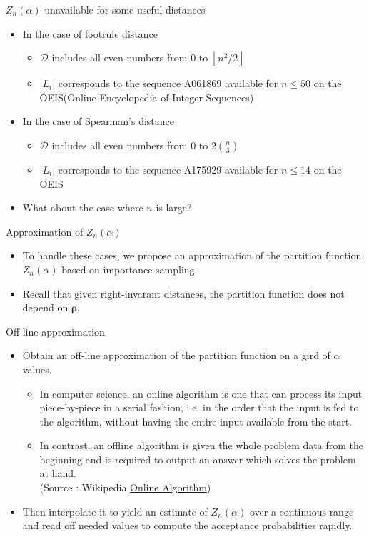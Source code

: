 \documentclass[11pt]{beamer}
\newcommand{\floor}[1]{\left\lfloor #1 \right\rfloor}
\begin{document}
\begin{frame}{$Z_n(\alpha)$ unavailable for some useful distances}
\begin{itemize}
    \item In the case of footrule distance
    \begin{itemize}
        \item $\mathcal{D}$ includes all even numbers from $0$ to $\floor{n^2/2}$
        \item $|L_i|$ corresponds to the sequence A061869 available for $n\leq 50$ on the OEIS(Online Encyclopedia of Integer Sequences)
    \end{itemize}
    \item In the case of Spearman's distance
    \begin{itemize}
        \item $\mathcal{D}$ includes all even numbers from $0$ to $2\binom{n}{3}$
        \item $|L_i|$ corresponds to the sequence A175929 available for $n\leq 14$ on the OEIS
    \end{itemize}
    \item What about the case where $n$ is large?
\end{itemize}
\end{frame}

\begin{frame}{Approximation of $Z_n(\alpha)$}
\begin{itemize}
    \item To handle these cases, we propose an approximation of the partition function $Z_n(\alpha)$ based on importance sampling. 
    \item Recall that given right-invarant distances, the partition function does not depend on $\boldsymbol{\rho}$. 
\end{itemize}
\end{frame}

\begin{frame}{Off-line approximation}
\begin{itemize}
    \item Obtain an off-line approximation of the partition function on a gird of $\alpha$ values. 
    \begin{itemize}
        \item In computer science, an online algorithm is one that can process its input piece-by-piece in a serial fashion, i.e. in the order that the input is fed to the algorithm, without having the entire input available from the start.
        \item In contrast, an offline algorithm is given the whole problem data from the beginning and is required to output an answer which solves the problem at hand. \\ (Source : Wikipedia \href{https://en.wikipedia.org/wiki/Online_algorithm}{Online Algorithm})
    \end{itemize}
    \item Then interpolate it to yield an estimate of $Z_n(\alpha)$ over a continuous range and read off needed values to compute the acceptance probabilities rapidly.
\end{itemize}
\end{frame}
\end{document}
